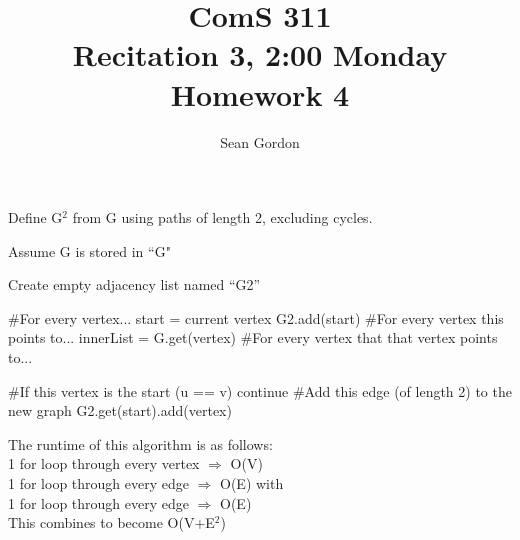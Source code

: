 \documentclass[12pt]{article}
\title{ComS 311\\Recitation 3, 2:00 Monday\\Homework 4}
\author{Sean Gordon}
\begin{document}
\maketitle


\begin{algorithm}[H]
\caption{Define G$^2$ from G using paths of length 2, excluding cycles.}
\begin{algorithmic}
\State Assume G is stored in ``G"

\State
\State Create empty adjacency list named ``G2''
\State

\State \#For every vertex...
\State start = current vertex
\State G2.add(start)
\State
\State \#For every vertex this points to...
\State innerList = G.get(vertex)
\State
\State \#For every vertex that that vertex points to...

\State
\State \#If this vertex is the start (u == v)
\State continue
\EndIf
\State
\State \#Add this edge (of length 2) to the new graph
\State G2.get(start).add(vertex)

\EndFor
\EndFor
\EndFor
\State
\end{algorithmic}
\end{algorithm}
\noindent The runtime of this algorithm is as follows:\\
1 for loop through every vertex $\Rightarrow$ O(V)\\
1 for loop through every edge $\Rightarrow$ O(E) with\\
1 for loop through every edge $\Rightarrow$ O(E)\\
This combines to become O(V+E$^2$)





\pagebreak
\end{document}
